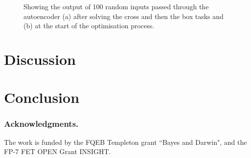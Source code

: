 \documentclass[runningheads,a4paper]{llncs}
\begin{document}
\begin{figure}[!]
{{    \label{fig:subfig2}
    }
}
\caption[Optional caption for list of figures]{Showing the output of 100 random inputs passed through the autoencoder (a) after solving the cross and then the box tasks and (b) at the start of the optimisation process.}
\label{figure:experiment_subplots}
\end{figure}
\section{Discussion}

\section{Conclusion}

\subsubsection*{Acknowledgments.} The work is funded by the FQEB Templeton grant ``Bayes and Darwin", and the FP-7 FET OPEN Grant INSIGHT.



\end{document}
